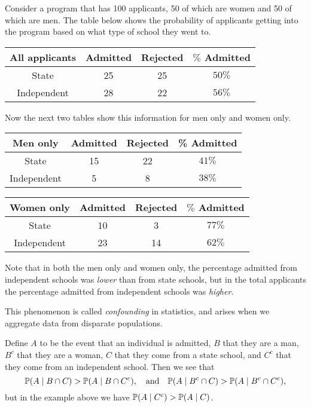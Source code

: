 \documentclass[a4paper]{scrreprt}
\begin{document}
\begin{example}
	Consider a program that has 100 applicants, 50 of which are women and 50 of which are men. The table below shows the probability of applicants getting into the program based on what type of school they went to.
	\begin{center}
	\begin{tabular}{|c|c|c|c|}
		\hline All applicants & Admitted & Rejected & $\%$ Admitted \\
		\hline State & 25 & 25 & $50 \%$ \\
		\hline Independent & 28 & 22 & $56 \%$ \\
		\hline
		\end{tabular}
	\end{center}
	Now the next two tables show this information for men only and women only.
	\begin{center}
		\begin{tabular}{|c|c|c|c|}
			\hline Men only & Admitted & Rejected & \% Admitted \\
			\hline State & 15 & 22 & $41 \%$ \\
			\hline Independent & 5 & 8 & $38 \%$ \\
			\hline
			\end{tabular}
		\end{center}
		\begin{center}
			\begin{tabular}{|c|c|c|c|}
				\hline Women only & Admitted & Rejected & $\%$ Admitted \\
				\hline State & 10 & 3 & $77 \%$ \\
				\hline Independent & 23 & 14 & $62 \%$ \\
				\hline
				\end{tabular}
	\end{center}

	Note that in both the men only and women only, the percentage admitted from independent schools was \emph{lower} than from state schools, but in the total applicants the percentage admitted from independent schools was \emph{higher}.

	This phenomenon is called \emph{confounding} in statistics, and arises when we aggregate data from disparate populations.

	Define $A$ to be the event that an individual is admitted, $B$ that they are a man, $B^c$ that they are a woman, $C$ that they come from a state school, and $C^c$ that they come from an independent school. Then we see that
	$$
	\mathbb{P}(A \mid B \cap C) > \mathbb{P}(A \mid B \cap C^c), \quad \text{and} \quad \mathbb{P}(A \mid B^c \cap C) > \mathbb{P}(A \mid B^c \cap C^c),
	$$
	but in the example above we have $\mathbb{P}(A \mid C^c) > \mathbb{P}(A \mid C)$.


\end{example}
\end{document}
